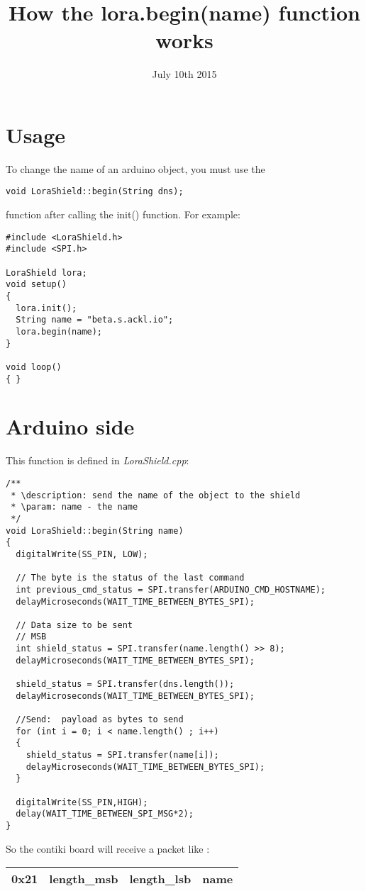 \documentclass{article}
\title{How the lora.begin(name) function works}
\date{July 10th 2015}
\begin{document}
\maketitle

\tableofcontents


\section{Usage}
To change the name of an arduino object, you must use the
\begin{verbatim}
void LoraShield::begin(String dns);
\end{verbatim}
function after calling the init() function. For example:
\begin{verbatim}
#include <LoraShield.h>
#include <SPI.h>

LoraShield lora;
void setup()
{
  lora.init();
  String name = "beta.s.ackl.io";
  lora.begin(name);
}

void loop()
{ }
\end{verbatim}
\section{Arduino side}
This function is defined in \emph{LoraShield.cpp}:
\begin{verbatim}
/**
 * \description: send the name of the object to the shield
 * \param: name - the name
 */
void LoraShield::begin(String name)
{
  digitalWrite(SS_PIN, LOW);

  // The byte is the status of the last command
  int previous_cmd_status = SPI.transfer(ARDUINO_CMD_HOSTNAME); 
  delayMicroseconds(WAIT_TIME_BETWEEN_BYTES_SPI);
  
  // Data size to be sent
  // MSB
  int shield_status = SPI.transfer(name.length() >> 8);
  delayMicroseconds(WAIT_TIME_BETWEEN_BYTES_SPI);

  shield_status = SPI.transfer(dns.length());
  delayMicroseconds(WAIT_TIME_BETWEEN_BYTES_SPI);

  //Send:  payload as bytes to send
  for (int i = 0; i < name.length() ; i++)
  {
    shield_status = SPI.transfer(name[i]);
    delayMicroseconds(WAIT_TIME_BETWEEN_BYTES_SPI);
  }

  digitalWrite(SS_PIN,HIGH); 
  delay(WAIT_TIME_BETWEEN_SPI_MSG*2);
}
\end{verbatim}
So the contiki board will receive a packet like :
\begin{tabular}{|c|c|c|c|}
\hline
0x21 & length\_msb & length\_lsb & name\\
\hline
\end{tabular}
\end{document}
